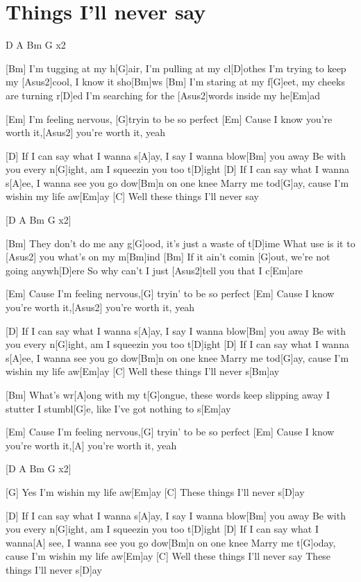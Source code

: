 \section{Things I'll never say}
\begin{guitar}
D A Bm G x2


[Bm]{}   I'm tugging at my h[G]air, I'm pulling at my cl[D]othes
   I'm trying to keep my [Asus2]cool, I know it sho[Bm]ws
[Bm]   I'm staring at my f[G]eet, my cheeks are turning r[D]ed
   I'm searching for the [Asus2]words inside my he[Em]ad


[Em]  I'm feeling nervous, [G]tryin to be so perfect
[Em]  Cause I know you're worth it,[Asus2] you're worth it, yeah


[D]  If I can say what I wanna s[A]ay, I say I wanna blow[Bm] you away
  Be with you every n[G]ight, am I squeezin you too t[D]ight
[D]  If I can say what I wanna s[A]ee, I wanna see you go dow[Bm]n on one knee
  Marry me tod[G]ay, cause I'm wishin my life aw[Em]ay
[C]  Well these things I'll never say


[D A Bm G x2]{}


[Bm]  They don't do me any g[G]ood, it's just a waste of t[D]ime
  What use is it to [Asus2] you  what's on my m[Bm]ind
[Bm]  If it ain't comin [G]out, we're not going anywh[D]ere
  So why can't I just [Asus2]tell you that I c[Em]are


[Em]  Cause I'm feeling nervous,[G] tryin' to be so perfect
[Em]  Cause I know you're worth it,[Asus2] you're worth it, yeah


[D]  If I can say what I wanna s[A]ay, I say I wanna blow[Bm] you away
  Be with you every n[G]ight, am I squeezin you too t[D]ight
[D]  If I can say what I wanna s[A]ee, I wanna see you go dow[Bm]n on one knee
  Marry me tod[G]ay, cause I'm wishin my life aw[Em]ay
[C]  Well these things I'll never s[Bm]ay


[Bm]  What's wr[A]ong with my t[G]ongue, these words keep slipping away
  I stutter I stumbl[G]e, like I've got nothing to s[Em]ay


[Em]  Cause I'm feeling nervous,[G] tryin' to be so perfect
[Em]  Cause I know you're worth it,[A] you're worth it, yeah



[D A Bm G x2]{}


[G]  Yes I'm wishin my life aw[Em]ay
[C]  These things I'll never s[D]ay


[D]  If I can say what I wanna s[A]ay, I say I wanna blow[Bm] you away
  Be with you every n[G]ight, am I squeezin you too t[D]ight
[D]  If I can say what I wanna[A] see, I wanna see you go dow[Bm]n on one knee
  Marry me t[G]oday, cause I'm wishin my life aw[Em]ay
[C]  Well these things I'll never say
  These things I'll never s[D]ay
\end{guitar}
